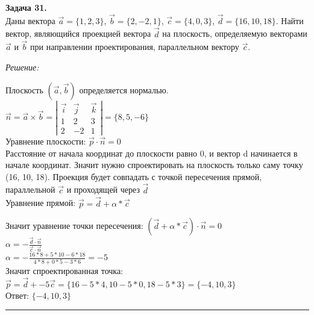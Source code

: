 \documentclass[a4paper, 12pt]{article}
\newenvironment{problem}[2][Задача]
    { \begin{mdframed}[backgroundcolor=gray!10] \textbf{#1 #2.} \\}
    {  \end{mdframed}}
\newenvironment{solution}
    {\textit{Решение: }}
    {\noindent\rule{7in}{1.5pt}}
\begin{document}
\begin{problem}{31}
Даны вектора $\vec{a}=\{1,2,3\}$, $\vec{b}=\{2,-2,1\}$, $\vec{c}=\{4,0,3\}$, $\vec{d}=\{16,10,18\}$.
Найти вектор, являющийся проекцией вектора $\vec d$ на плоскость, определяемую векторами
$\vec a$ и $\vec b$ при направлении проектирования, параллельном вектору $\vec c$.
\end{problem}
\begin{solution}

Плоскость $(\overrightarrow{a}, \overrightarrow{b})$ определяется нормалью. \\
$
\overrightarrow{n} =
\overrightarrow{a} \times \overrightarrow{b} =
\left|
  \begin{array}{rrr}
    \overrightarrow{i} & \overrightarrow{j} & \overrightarrow{k} \\
    1 &  2 & 3 \\
    2 & -2 & 1
  \end{array}
\right|
= \{8, 5, -6\}
$
\\ Уравнение плоскости: $\overrightarrow{p} \cdot \overrightarrow{n} = 0$ \\
Расстояние от начала координат до плоскости равно 0, и вектор d начинается в начале координат.
Значит нужно спроектировать на плоскость только саму точку (16, 10, 18).
Проекция будет совпадать с точкой пересечения прямой, параллельной $\overrightarrow{c}$ и проходящей через $\overrightarrow{d}$
\\ Уравнение прямой: $\overrightarrow{p} = \overrightarrow{d} + \alpha * \overrightarrow{c}$

Значит уравнение точки пересечения:
$(\overrightarrow{d} + \alpha * \overrightarrow{c}) \cdot \overrightarrow{n} = 0$ \\
$\alpha = -\frac{\overrightarrow{d} \cdot \overrightarrow{n}}{\overrightarrow{c} \cdot \overrightarrow{n}}$ \\
$\alpha = -\frac{16 * 8 + 5 * 10 - 6 * 18}{4 * 8 + 0 * 5 - 3 * 6} = -5$ \\

Значит спроектированная точка:
$
\overrightarrow{p} =
\overrightarrow{d} + -5\overrightarrow{c} =
\{16 - 5 * 4, 10 - 5 * 0, 18 - 5 * 3\} = \{-4, 10, 3\}
$ \\
Ответ: $\{-4, 10, 3\}$


\end{solution}
\end{document}
